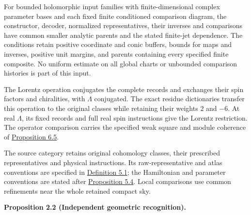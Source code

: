 \documentclass[
  english,
  11pt,
  reqno]{amsart}
\makeatletter
\newcommand{\pandocstatementheading}[1]{%
  \par\addpenalty{\@beginparpenalty}%
  \addvspace{.5\baselineskip plus .2\baselineskip minus .2\baselineskip}%
  {\normalfont\bfseries #1\par}%
  \nobreak\@afterindenttrue\@afterheading
}
\makeatother
\begin{document}
For bounded holomorphic input families with finite-dimensional complex
parameter bases and each fixed finite conditioned comparison diagram,
the constructor, decoder, normalized representatives, their inverses and
comparisons have common smaller analytic parents and the stated
finite-jet dependence. The conditions retain positive coordinate and
conic buffers, bounds for maps and inverses, positive unit margins, and
parents containing every specified finite composite. No uniform estimate
on all global charts or unbounded comparison histories is part of this
input.

The Lorentz operation conjugates the complete records and exchanges
their spin factors and chiralities, with \(\Lambda\) conjugated. The
exact residue dictionaries transfer this operation to the original
classes while retaining their weights \(2\) and \(-6\). At real
\(\Lambda\), its fixed records and full real spin instructions give the
Lorentz restriction. The operator comparison carries the specified weak
square and module coherence of
\hyperref[prop:operator-monodromy-lorentz-reality]{Proposition 6.5}.

The source category retains original cohomology classes, their
prescribed representatives and physical instructions. Its
raw-representative and atlas conventions are specified in
\hyperref[def:independent-original-source-atlas]{Definition 5.1}; the
Hamiltonian and parameter conventions are stated after
\hyperref[prop:source-atlas-local-analytic-execution]{Proposition 5.4}.
Local comparisons use common refinements near the whole retained compact
sky.

\pandocstatementheading{\protect{}\label{prop:independent-local-ray-recognition-v09}Proposition 2.2 (Independent geometric recognition).}
\end{document}
